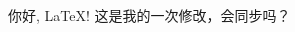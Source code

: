 \documentclass{article}
\begin{document}
\begin{CJK}{UTF8}{gkai}%

你好, LaTeX!
这是我的一次修改，会同步吗？
\end{CJK}
\end{document}
